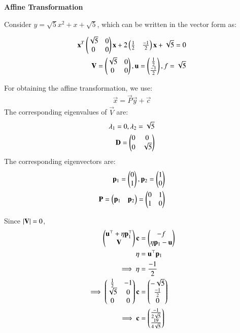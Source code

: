 \documentclass[journal,12pt,twocolumn]{IEEEtran}
\begin{document}
\textbf{Affine Transformation}

Consider $y = \sqrt{5}x^2 + x + \sqrt{5}$, which can be written in the vector form as:


\begin{align}
\mathbf{x}^T \begin{pmatrix}\sqrt{5} & 0\\0 & 0\end{pmatrix}\mathbf{x} + 2\begin{pmatrix}\frac{1}{2} & \frac{-1}{2}\end{pmatrix}\mathbf{x} + \sqrt{5} = 0\\
\mathbf{V} = \begin{pmatrix}\sqrt{5} & 0\\0 & 0\end{pmatrix} , \mathbf{u} = \begin{pmatrix}\frac{1}{2}\\ \frac{-1}{2}\end{pmatrix} , f = \sqrt{5}
\end{align}

For obtaining the affine transformation, we use:
\begin{align}
    \vec{x} = \vec{P}\vec{y} + \vec{c}
\end{align}
The corresponding eigenvalues of $\vec{V}$ are:
\begin{align}
    \lambda_1 = 0 , \lambda_2 = \sqrt{5}\\
    \mathbf{D} = \begin{pmatrix}0 & 0\\0 & \sqrt{5}\end{pmatrix}
\end{align}
The corresponding eigenvectors are:
\begin{align}
    \mathbf{p}_1 = \begin{pmatrix}0\\1\end{pmatrix} , \mathbf{p}_2 = \begin{pmatrix}1\\0\end{pmatrix}\\
    \mathbf{P} = \begin{pmatrix}\mathbf{p}_1 & \mathbf{p}_2\end{pmatrix} = \begin{pmatrix}0 & 1\\1 & 0\end{pmatrix}
\end{align}

Since $\left\vert\mathbf{V}\right\vert = 0$,
\begin{align}
    \begin{pmatrix}\mathbf{u}^\top+\eta \mathbf{p}_1^\top\\\mathbf{V}\end{pmatrix}\mathbf{c} &= \begin{pmatrix}-f\\\eta \mathbf{p}_1-\mathbf{u}\end{pmatrix}\\
    \eta &= \mathbf{u}^\top \mathbf{p}_1\\
    \implies \eta &= \frac{-1}{2}\\
    \implies \begin{pmatrix}\frac{1}{2}&-1\\\sqrt{5}&0\\0&0\end{pmatrix}\mathbf{c} &= \begin{pmatrix}-\sqrt{5}\\\frac{-1}{2}\\0\end{pmatrix}\\
    \implies \mathbf{c} &= \begin{pmatrix}\frac{-1}{2\sqrt{5}}\\\frac{19}{4\sqrt{5}}\end{pmatrix}
\end{align}
\end{document}
